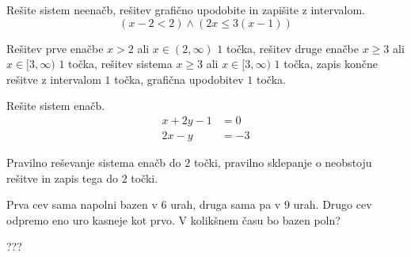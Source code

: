 \documentclass[addpoints,12pt]{exam}
\begin{document}
\begin{questions}
        

    \newpage
    \question[5]
    Rešite sistem neenačb, rešitev grafično upodobite in zapišite z intervalom.
    $$ \left(x-2<2\right)\land\left(2x\leq 3(x-1)\right) $$
    
    
    \begin{solution}[11cm]
        Rešitev prve enačbe $x>2$ ali $x\in(2,\infty)$ $1$ točka, rešitev druge enačbe $x\geq 3$ ali $x\in[3,\infty)$ $1$ točka, rešitev sistema $x\geq 3$ ali $x\in[3,\infty)$ $1$ točka, zapis končne rešitve z intervalom $1$ točka, grafična upodobitev $1$ točka.
    \end{solution}


    \newpage


    \question[4]
    Rešite sistem enačb.
    $$ \begin{aligned}
        x+2y-1&=0 \\ 2x-y&=-3
    \end{aligned} $$
    
    
    \begin{solution}[8cm]
        Pravilno reševanje sistema enačb do $2$ točki, pravilno sklepanje o neobstoju rešitve in zapis tega do $2$ točki.
    \end{solution}

\newpage

    \question[4]
    Prva cev sama napolni bazen v $6$ urah, druga sama pa v $9$ urah. Drugo cev odpremo eno uro kasneje kot prvo.
    V kolikšnem času bo bazen poln?
    
    
    \begin{solution}[10cm]
        ???
    \end{solution}




    \newpage 

    
    
    
    





\end{questions}
\end{document}
